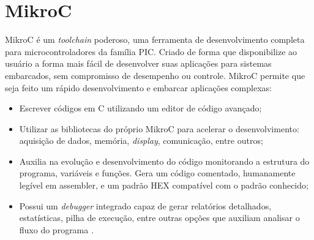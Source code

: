\section{MikroC}
MikroC é um \emph{toolchain} poderoso, uma ferramenta de desenvolvimento completa para microcontroladores da família PIC. Criado de forma que disponibilize ao usuário a forma mais fácil de desenvolver suas aplicações para sistemas embarcados, sem compromisso de desempenho ou controle. MikroC permite que seja feito um rápido desenvolvimento e embarcar aplicações complexas:

\begin{itemize}
\item Escrever códigos em C utilizando um editor de código avançado;
\item Utilizar as bibliotecas do próprio MikroC para acelerar o desenvolvimento: aquisição de dados, memória, \emph{display}, comunicação, entre outros;
\item Auxilia na evolução e desenvolvimento do código monitorando a estrutura do programa, variáveis e funções. Gera um código comentado, humanamente legível em assembler, e um padrão HEX compatível com o padrão conhecido;
\item Possui um \emph{debugger} integrado capaz de gerar relatórios detalhados, estatísticas, pilha de execução, entre outras opções que auxiliam analisar o fluxo do programa \cite{mikroc2006}.
\end{itemize}